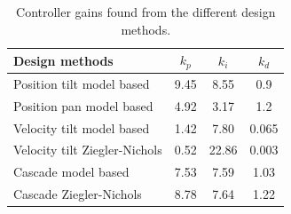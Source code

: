 \documentclass[../../main.tex]{subfiles}
\begin{document}
\begin{table}[]
    \centering
    \begin{tabular}{l c c c}
        Design methods                      & $k_{p}$ & $k_{i}$ & $k_{d}$ \\
        \hline
        Position tilt model based   & 9.45 & 8.55 & 0.9     \\
        Position pan model based    & 4.92 & 3.17 & 1.2     \\
        Velocity tilt model based   & 1.42 & 7.80 & 0.065   \\
        Velocity tilt Ziegler-Nichols & 0.52 & 22.86 & 0.003 \\
        Cascade model based         & 7.53 & 7.59 & 1.03    \\
        Cascade Ziegler-Nichols     & 8.78 & 7.64 & 1.22    \\
        \hline
    \end{tabular}
    \caption{Controller gains found from the different design methods. }
    \label{tab:pos_controller_gains}
\end{table}
\end{document}
